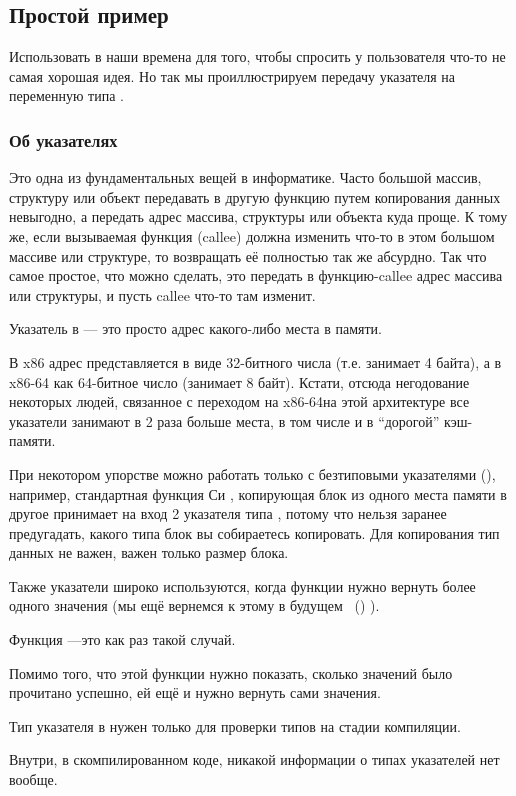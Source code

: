 \subsection{Простой пример}



Использовать \scanf в наши времена для того, чтобы спросить у пользователя что-то\EMDASH{} 
не самая хорошая идея.
Но так мы проиллюстрируем передачу указателя на переменную типа \Tint.

\subsubsection{Об указателях}
\myindex{\CLanguageElements!\Pointers}

Это одна из фундаментальных вещей в информатике.
Часто большой массив, структуру или объект передавать в другую функцию путем копирования данных невыгодно, а передать адрес массива, структуры или объекта куда проще.
К тому же, если вызываемая функция (\gls{callee}) должна изменить что-то в этом большом массиве или структуре, то возвращать её полностью так же абсурдно.
Так что самое простое, что можно сделать, это передать в функцию-\gls{callee} адрес массива или структуры, и пусть \gls{callee} что-то там изменит.

Указатель в \CCpp --- это просто адрес какого-либо места в памяти.

В x86 адрес представляется в виде 32-битного числа (т.е. занимает 4 байта), а в x86-64 как 64-битное число (занимает 8 байт).
Кстати, отсюда негодование некоторых людей, связанное с переходом на x86-64\EMDASH{}на этой архитектуре все указатели занимают в 2 раза больше места, в том числе и в ``дорогой'' кэш-памяти.

При некотором упорстве можно работать только с безтиповыми указателями (), например, стандартная функция Си ,
копирующая блок из одного места памяти в другое принимает на вход 2 указателя типа , потому что нельзя заранее предугадать, какого типа блок вы собираетесь копировать.
Для копирования тип данных не важен, важен только размер блока.

Также указатели широко используются, когда функции нужно вернуть более одного значения
(мы ещё вернемся к этому в будущем
~()
).

Функция ---это как раз такой случай.

Помимо того, что этой функции нужно показать, сколько значений было прочитано успешно, ей ещё и нужно вернуть сами значения.

Тип указателя в \CCpp нужен только для проверки типов на стадии компиляции.

Внутри, в скомпилированном коде, никакой информации о типах указателей нет вообще.





